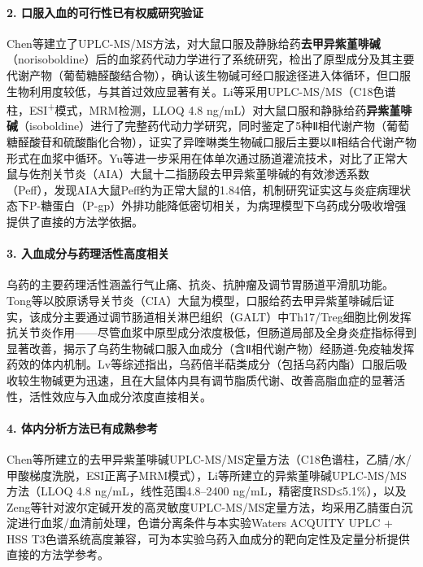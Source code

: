 \documentclass[12pt,a4paper,UTF8,scheme=chinese]{ctexart}
\newcommand{\compoundname}[1]{\textbf{#1}}
\begin{document}
\paragraph{2. 口服入血的可行性已有权威研究验证}

Chen等\cite{Chen2011W}建立了UPLC-MS/MS方法，对大鼠口服及静脉给药\compoundname{去甲异紫堇啡碱}（norisoboldine）后的血浆药代动力学进行了系统研究，检出了原型成分及其主要代谢产物（葡萄糖醛酸结合物），确认该生物碱可经口服途径进入体循环，但口服生物利用度较低，与其首过效应显著有关。Li等\cite{Li2015W}采用UPLC-MS/MS（C18色谱柱，ESI\textsuperscript{+}模式，MRM检测，LLOQ 4.8 ng/mL）对大鼠口服和静脉给药\compoundname{异紫堇啡碱}（isoboldine）进行了完整药代动力学研究，同时鉴定了5种Ⅱ相代谢产物（葡萄糖醛酸苷和硫酸酯化合物），证实了异喹啉类生物碱口服后主要以Ⅱ相结合代谢产物形式在血浆中循环。Yu等\cite{Dai2017}进一步采用在体单次通过肠道灌流技术，对比了正常大鼠与佐剂关节炎（AIA）大鼠十二指肠段去甲异紫堇啡碱的有效渗透系数（Peff），发现AIA大鼠Peff约为正常大鼠的1.84倍，机制研究证实这与炎症病理状态下P-糖蛋白（P-gp）外排功能降低密切相关，为病理模型下乌药成分吸收增强提供了直接的方法学依据。

\paragraph{3. 入血成分与药理活性高度相关}

乌药的主要药理活性涵盖行气止痛、抗炎、抗肿瘤及调节胃肠道平滑肌功能。Tong等\cite{Tong2015}以胶原诱导关节炎（CIA）大鼠为模型，口服给药去甲异紫堇啡碱后证实，该成分主要通过调节肠道相关淋巴组织（GALT）中Th17/Treg细胞比例发挥抗关节炎作用——尽管血浆中原型成分浓度极低，但肠道局部及全身炎症指标得到显著改善，揭示了乌药生物碱口服入血成分（含Ⅱ相代谢产物）经肠道-免疫轴发挥药效的体内机制。Lv等\cite{Lv2023}综述指出，乌药倍半萜类成分（包括乌药内酯）口服后吸收较生物碱更为迅速，且在大鼠体内具有调节脂质代谢、改善高脂血症的显著活性，活性效应与入血成分浓度直接相关。

\paragraph{4. 体内分析方法已有成熟参考}

Chen等\cite{Chen2011W}所建立的去甲异紫堇啡碱UPLC-MS/MS定量方法（C18色谱柱，乙腈/水/甲酸梯度洗脱，ESI正离子MRM模式），Li等\cite{Li2015W}所建立的异紫堇啡碱UPLC-MS/MS方法（LLOQ 4.8 ng/mL，线性范围4.8--2400 ng/mL，精密度RSD≤5.1\%），以及Zeng等\cite{Chen2011W}针对波尔定碱开发的高灵敏度UPLC-MS/MS定量方法，均采用乙腈蛋白沉淀进行血浆/血清前处理，色谱分离条件与本实验Waters ACQUITY UPLC + HSS T3色谱系统高度兼容，可为本实验乌药入血成分的靶向定性及定量分析提供直接的方法学参考。
\end{document}
